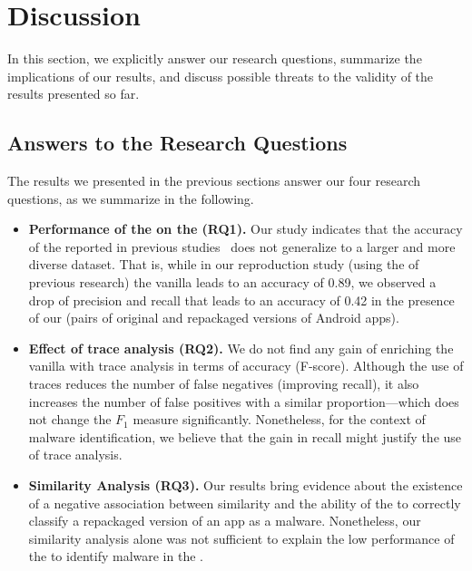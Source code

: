 \section{Discussion}

In this section, we explicitly answer our research questions,
summarize the implications of our results, and discuss possible
threats to the validity of the results presented so far.

\subsection{Answers to the Research Questions}

The results we presented in the previous sections
 answer our four research questions, as
we summarize in the following.

\begin{itemize}
\item \textbf{Performance of the \mas on the \cds (RQ1).} 
  Our study indicates that the accuracy of the \mas reported in previous studies~\cite{DBLP:conf/wcre/BaoLL18,DBLP:journals/jss/CostaMMSSBNR22} does not
  generalize to a larger and more diverse dataset. That is, while in our
  reproduction study (using the \sds of previous research) the vanilla \mas
  leads to an accuracy of 0.89, we observed a drop of precision and recall
  that leads to an accuracy of 0.42 in the presence of our \cds (\apps pairs of
  original and repackaged versions of Android apps). 

\item \textbf{Effect of trace analysis (RQ2).} We do not find any gain of enriching the vanilla \mas with
  trace analysis in terms of accuracy (F-score). Although the use of traces
  reduces the number of false negatives (improving recall), it also increases the number of false
  positives with a similar proportion---which does not change the $F_1$ measure significantly.
  Nonetheless, for the context of malware identification, we believe that the
  gain in recall might justify the use of trace analysis.

\item \textbf{Similarity Analysis (RQ3).} Our results bring evidence about the existence of a negative
  association between similarity and the ability of the \mas to correctly
  classify a repackaged version of an app as a malware. Nonetheless,
  our similarity analysis alone was not sufficient to explain the low
  performance of the \mas to identify malware in the \cds.


\end{itemize}
